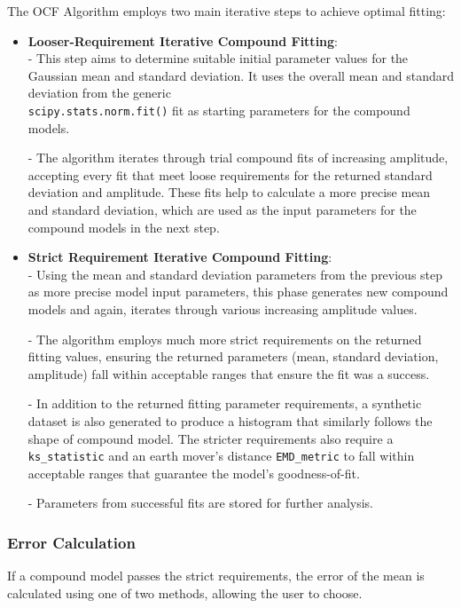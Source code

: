 \documentclass[svgnames]{article}     %
\begin{document}
The OCF Algorithm employs two main iterative steps to achieve optimal fitting: 

\begin{itemize}
  \item[1.] \textbf{Looser-Requirement Iterative Compound Fitting}:\\
  - This step aims to determine suitable initial parameter values for the
  Gaussian mean and standard deviation. It uses the overall mean and standard
  deviation from the generic \\ \verb|scipy.stats.norm.fit()| fit as starting
  parameters for the compound models. 

  - The algorithm iterates through trial compound fits of increasing amplitude,
  accepting every fit that meet loose requirements for the returned standard
  deviation and amplitude. These fits help to calculate a more precise mean and
  standard deviation, which are used as the input parameters for the compound
  models in the next step. 

  \item[2.] \textbf{Strict Requirement Iterative Compound Fitting}:\\ 
  - Using the mean and standard deviation parameters from the previous step as
  more precise model input parameters, this phase generates new compound models
  and again, iterates through various increasing amplitude values. 

  - The algorithm employs much more strict requirements on the returned fitting
  values, ensuring the returned parameters (mean, standard deviation,
  amplitude) fall within acceptable ranges that ensure the fit was a success.

  - In addition to the returned fitting parameter requirements, a synthetic
  dataset is also generated to produce a histogram that similarly follows the
  shape of compound model. The stricter requirements also require
  a \verb|ks_statistic| and an earth mover's distance \verb|EMD_metric| to fall
  within acceptable ranges that guarantee the model's goodness-of-fit. 

  - Parameters from successful fits are stored for further analysis. 
\end{itemize}

\subsubsection{Error Calculation} 

If a compound model passes the strict requirements, the error of the mean is
calculated using one of two methods, allowing the user to choose. 
\end{document}
